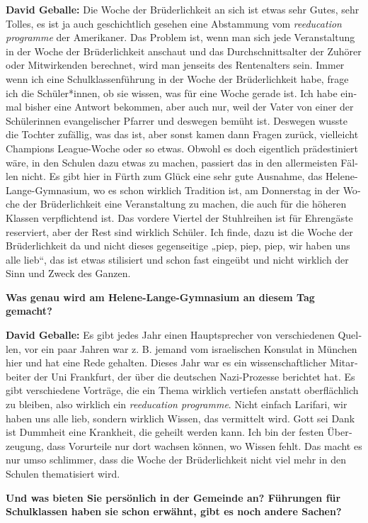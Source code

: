 \begin{otherlanguage}{ngerman}
\textbf{David Geballe:} Die Woche der Brüderlichkeit an sich ist etwas sehr Gutes, sehr Tolles, es ist ja auch geschichtlich gesehen eine Abstammung vom \textit{reeducation programme} der Amerikaner. Das Problem ist, wenn man sich jede Veranstaltung in der Woche der Brüderlichkeit anschaut und das Durchschnittsalter der Zuhörer oder Mitwirkenden berechnet, wird man jenseits des Rentenalters sein. Immer wenn ich eine Schulklassenführung in der Woche der Brüderlichkeit habe, frage ich die Schüler*innen, ob sie wissen, was für eine Woche gerade ist. Ich habe einmal bisher eine Antwort bekommen, aber auch nur, weil der Vater von einer der Schülerinnen evangelischer Pfarrer und deswegen bemüht ist. Deswegen wusste die Tochter zufällig, was das ist, aber sonst kamen dann Fragen zurück, vielleicht Champions League-Woche oder so etwas. Obwohl es doch eigentlich prädestiniert wäre, in den Schulen dazu etwas zu machen, passiert das in den allermeisten Fällen nicht. Es gibt hier in Fürth zum Glück eine sehr gute Ausnahme, das Helene-Lange-Gymnasium, wo es schon wirklich Tradition ist, am Donnerstag in der Woche der Brüderlichkeit eine Veranstaltung zu machen, die auch für die höheren Klassen verpflichtend ist. Das vordere Viertel der Stuhlreihen ist für Ehrengäste reserviert, aber der Rest sind wirklich Schüler. Ich finde, dazu ist die Woche der Brüderlichkeit da und nicht dieses gegenseitige „piep, piep, piep, wir haben uns alle lieb“, das ist etwas stilisiert und schon fast eingeübt und nicht wirklich der Sinn und Zweck des Ganzen. 

\textbf{Was genau wird am Helene-Lange-Gymnasium an diesem Tag gemacht?} 

\textbf{David Geballe:} Es gibt jedes Jahr einen Hauptsprecher von verschiedenen Quellen, vor ein paar Jahren war z. B. jemand vom israelischen Konsulat in München hier und hat eine Rede gehalten. Dieses Jahr war es ein wissenschaftlicher Mitarbeiter der Uni Frankfurt, der über die deutschen Nazi-Prozesse berichtet hat. Es gibt verschiedene Vorträge, die ein Thema wirklich vertiefen anstatt oberflächlich zu bleiben, also wirklich ein \textit{reeducation programme}. Nicht einfach Larifari, wir haben uns alle lieb, sondern wirklich Wissen, das vermittelt wird. Gott sei Dank ist Dummheit eine Krankheit, die geheilt werden kann. Ich bin der festen Überzeugung, dass Vorurteile nur dort wachsen können, wo Wissen fehlt. Das macht es nur umso schlimmer, dass die Woche der Brüderlichkeit nicht viel mehr in den Schulen thematisiert wird. 

\textbf{Und was bieten Sie persönlich in der Gemeinde an? Führungen für Schulklassen haben sie schon erwähnt, gibt es noch andere Sachen?} 


\end{otherlanguage}

